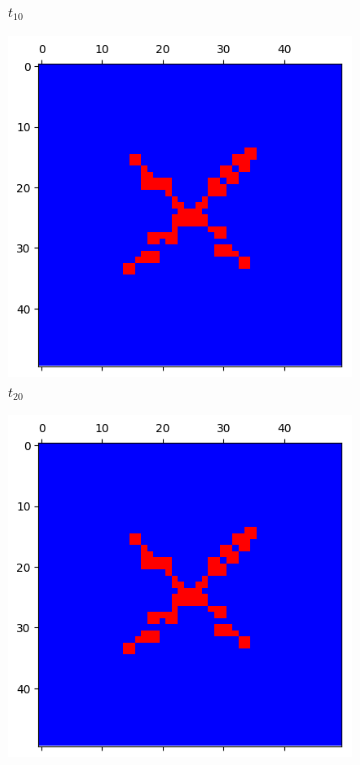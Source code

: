 \documentclass[letterpaper]{article}
\begin{document}
\begin{figure}[H]
\begin{subfigure}{.33\textwidth}
      \caption{$t_{10}$}
    \end{subfigure}
    \begin{subfigure}{.33\textwidth}
      \centering
      \includegraphics[width=1\linewidth]{images/assign2/part31-coop/t20}
      \caption{$t_{20}$}
    \end{subfigure}
    \begin{subfigure}{.33\textwidth}
      \centering
      \includegraphics[width=1\linewidth]{images/assign2/part31-coop/t40}

\end{subfigure}
\end{figure}
\end{document}
